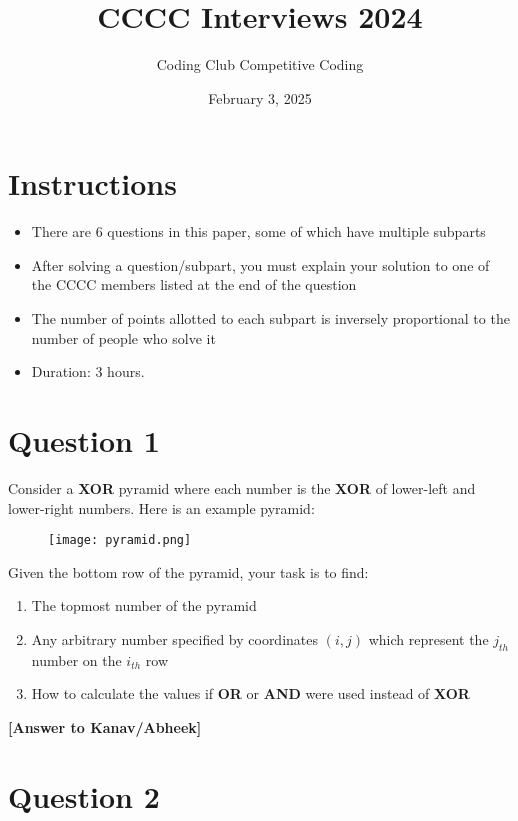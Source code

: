 \documentclass[a4paper,12pt]{article}
\title{\textbf{CCCC Interviews 2024}}
\author{Coding Club Competitive Coding}
\date{February 3, 2025}
\begin{document}
\maketitle
\hrulefill

\section*{Instructions}
\begin{itemize}
    \item There are 6 questions in this paper, some of which have multiple subparts
    \item After solving a question/subpart, you must explain your solution to one of the CCCC members listed at the end of the question
    \item The number of points allotted to each subpart is inversely proportional to the number of people who solve it
    \item Duration: 3 hours.
\end{itemize}

\hrulefill

\section*{Question 1}
Consider a \textbf{XOR} pyramid where each number is the \textbf{XOR} of lower-left and lower-right numbers. Here is an example pyramid:

\begin{figure}[H]
    \begin{center}
    \texttt{[image: pyramid.png]}
    \end{center}
\end{figure}

Given the bottom row of the pyramid, your task is to find:
\begin{enumerate}[label=\alph*)]
    \item The topmost number of the pyramid
    \item Any arbitrary number specified by coordinates $(i, j)$ which represent the $j_{th}$ number on the $i_{th}$ row
    \item How to calculate the values if \textbf{OR} or \textbf{AND} were used instead of \textbf{XOR}
\end{enumerate}

\textbf{[Answer to Kanav/Abheek]}

\hrulefill

\section*{Question 2}
\end{document}
